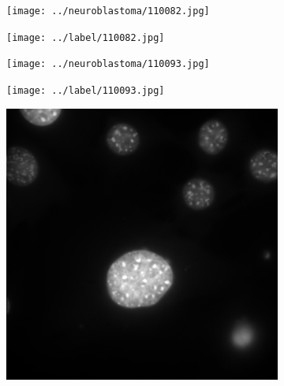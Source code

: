 \documentclass[10pt, journal, compsoc]{IEEEtran}
\begin{document}
\begin{figure}
\centering
\begin{subfigure}[b]{0.24\linewidth}
\texttt{[image: ../neuroblastoma/110082.jpg]}
\caption{}
\end{subfigure}
\begin{subfigure}[b]{0.24\linewidth}
\texttt{[image: ../label/110082.jpg]}
\caption{}
\end{subfigure}
\begin{subfigure}[b]{0.24\linewidth}
\texttt{[image: ../neuroblastoma/110093.jpg]}
\caption{}
\end{subfigure}
\begin{subfigure}[b]{0.24\linewidth}
\texttt{[image: ../label/110093.jpg]}
\caption{}
\end{subfigure}
\begin{subfigure}[b]{0.24\linewidth}
\includegraphics[width=\linewidth]{c127/108636.jpg}
\caption{}
\end{subfigure}
\begin{subfigure}[b]{0.24\linewidth}

\end{subfigure}
\end{figure}
\end{document}
